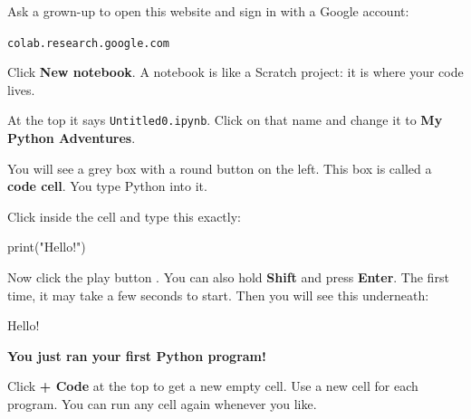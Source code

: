 Ask a grown-up to open this website and sign in with a Google account:
\begin{center}\Large\texttt{colab.research.google.com}\end{center}

Click \textbf{New notebook}. A notebook is like a Scratch project: it is where your code lives.

At the top it says \texttt{Untitled0.ipynb}. Click on that name and change it to \textbf{My Python Adventures}.

You will see a grey box with a round button on the left. This box is called a \textbf{code cell}. You type Python into it.

\begin{center}
\end{center}

Click inside the cell and type this exactly:

\begin{typethis}
print("Hello!")
\end{typethis}

Now click the play button \playbtn. You can also hold \textbf{Shift} and press \textbf{Enter}. The first time, it may take a few seconds to start. Then you will see this underneath:

\begin{outputbox}
Hello!
\end{outputbox}

\textbf{You just ran your first Python program!}

Click \textbf{+ Code} at the top to get a new empty cell. Use a new cell for each program. You can run any cell again whenever you like.

